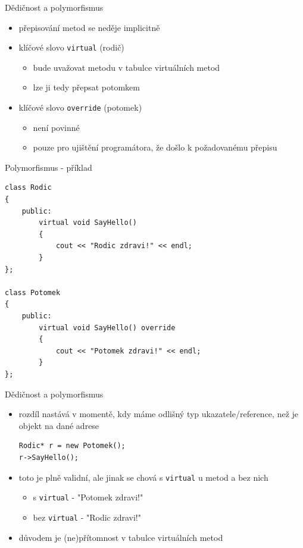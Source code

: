 \documentclass{beamer}
\begin{document}
\begin{xframe}{Dědičnost a polymorfismus}
	\begin{itemize}
		\item přepisování metod se neděje implicitně
		\item klíčové slovo \texttt{virtual} (rodič)
			\begin{itemize}
				\item bude uvažovat metodu v tabulce virtuálních metod
				\item lze ji tedy přepsat potomkem
			\end{itemize}
		\item klíčové slovo \texttt{override} (potomek)
			\begin{itemize}
				\item není povinné
				\item pouze pro ujištění programátora, že došlo k požadovanému přepisu
			\end{itemize}
	\end{itemize}
\end{xframe}

\begin{xframe}{Polymorfismus - příklad}
\begin{lstlisting}[basicstyle=\fontsize{9}{10}\selectfont\ttfamily]
class Rodic
{
    public:
        virtual void SayHello()
        {
            cout << "Rodic zdravi!" << endl;
        }
};

class Potomek
{
    public:
        virtual void SayHello() override
        {
            cout << "Potomek zdravi!" << endl;
        }
};
\end{lstlisting}
\end{xframe}

\begin{xframe}{Dědičnost a polymorfismus}
	\begin{itemize}
		\item rozdíl nastává v momentě, kdy máme odlišný typ ukazatele/reference, než je objekt na dané adrese
\begin{lstlisting}[basicstyle=\fontsize{9}{10}\selectfont\ttfamily]
Rodic* r = new Potomek();
r->SayHello();
\end{lstlisting}
		\item toto je plně validní, ale jinak se chová s \texttt{virtual} u metod a bez nich
			\begin{itemize}
				\item s \texttt{virtual} - "Potomek zdravi!"
				\item bez \texttt{virtual} - "Rodic zdravi!"
			\end{itemize}
		\item důvodem je (ne)přítomnost v tabulce virtuálních metod
	\end{itemize}
\end{xframe}
\end{document}
